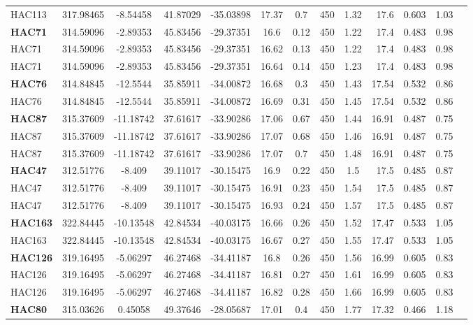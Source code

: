 \documentclass[a4paper,12pt]{article}
\begin{document}
\begin{longtable}{@{\extracolsep{\fill}}lccclccccrlll@{}}
HAC113 & 317.98465 & -8.54458 & 41.87029 & -35.03898 & 17.37 & 0.7 & 450 & 1.32 & 17.6 & 0.603 & 1.03 \\
\textbf{HAC71} & 314.59096 & -2.89353 & 45.83456 & -29.37351 & 16.6 & 0.12 & 450 & 1.22 & 17.4 & 0.483 & 0.98 \\
HAC71 & 314.59096 & -2.89353 & 45.83456 & -29.37351 & 16.62 & 0.13 & 450 & 1.22 & 17.4 & 0.483 & 0.98 \\
HAC71 & 314.59096 & -2.89353 & 45.83456 & -29.37351 & 16.64 & 0.14 & 450 & 1.23 & 17.4 & 0.483 & 0.98 \\
\textbf{HAC76} & 314.84845 & -12.5544 & 35.85911 & -34.00872 & 16.68 & 0.3 & 450 & 1.43 & 17.54 & 0.532 & 0.86 \\
HAC76 & 314.84845 & -12.5544 & 35.85911 & -34.00872 & 16.69 & 0.31 & 450 & 1.45 & 17.54 & 0.532 & 0.86 \\
\textbf{HAC87} & 315.37609 & -11.18742 & 37.61617 & -33.90286 & 17.06 & 0.67 & 450 & 1.44 & 16.91 & 0.487 & 0.75 \\
HAC87 & 315.37609 & -11.18742 & 37.61617 & -33.90286 & 17.07 & 0.68 & 450 & 1.46 & 16.91 & 0.487 & 0.75 \\
HAC87 & 315.37609 & -11.18742 & 37.61617 & -33.90286 & 17.07 & 0.7 & 450 & 1.48 & 16.91 & 0.487 & 0.75 \\
\textbf{HAC47} & 312.51776 & -8.409 & 39.11017 & -30.15475 & 16.9 & 0.22 & 450 & 1.5 & 17.5 & 0.485 & 0.87 \\
HAC47 & 312.51776 & -8.409 & 39.11017 & -30.15475 & 16.91 & 0.23 & 450 & 1.54 & 17.5 & 0.485 & 0.87 \\
HAC47 & 312.51776 & -8.409 & 39.11017 & -30.15475 & 16.93 & 0.24 & 450 & 1.57 & 17.5 & 0.485 & 0.87 \\
\textbf{HAC163} & 322.84445 & -10.13548 & 42.84534 & -40.03175 & 16.66 & 0.26 & 450 & 1.52 & 17.47 & 0.533 & 1.05 \\
HAC163 & 322.84445 & -10.13548 & 42.84534 & -40.03175 & 16.67 & 0.27 & 450 & 1.55 & 17.47 & 0.533 & 1.05 \\
\textbf{HAC126} & 319.16495 & -5.06297 & 46.27468 & -34.41187 & 16.8 & 0.26 & 450 & 1.56 & 16.99 & 0.605 & 0.83 \\
HAC126 & 319.16495 & -5.06297 & 46.27468 & -34.41187 & 16.81 & 0.27 & 450 & 1.61 & 16.99 & 0.605 & 0.83 \\
HAC126 & 319.16495 & -5.06297 & 46.27468 & -34.41187 & 16.82 & 0.28 & 450 & 1.66 & 16.99 & 0.605 & 0.83 \\
\textbf{HAC80} & 315.03626 & 0.45058 & 49.37646 & -28.05687 & 17.01 & 0.4 & 450 & 1.77 & 17.32 & 0.466 & 1.18 \\

\end{longtable}
\end{document}
